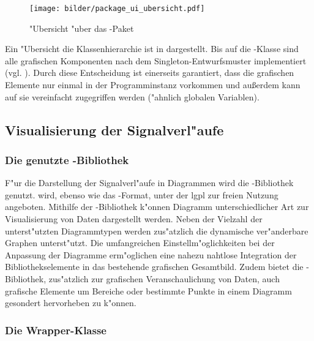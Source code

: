 \begin{figure}[htb]
\centering
\texttt{[image: bilder/package\_ui\_ubersicht.pdf]}
\caption{"Ubersicht "uber das -Paket}
\label{pic:package_ui_ubersicht}
\end{figure}

Ein "Ubersicht die Klassenhierarchie ist in  dargestellt.
Bis auf die -Klasse sind alle grafischen Komponenten nach dem Singleton-Entwurfsmuster implementiert (vgl. ).
Durch diese Entscheidung ist einerseits garantiert, dass die grafischen Elemente nur einmal in der Programminstanz vorkommen und au{\ss}erdem kann auf sie vereinfacht zugegriffen werden ("ahnlich globalen Variablen).


\subsection{Visualisierung der Signalverl"aufe}

\subsubsection{Die genutzte \jfcNS-Bibliothek}

F"ur die Darstellung der Signalverl"aufe in Diagrammen wird die \javaNS-Bibliothek \jfc genutzt.
\jfc wird, ebenso wie das \usNS-Format, unter der \ac{lgpl} zur freien Nutzung angeboten.
Mithilfe der \jfcNS-Bibliothek k"onnen Diagramm unterschiedlicher Art zur Visualisierung von Daten dargestellt werden.
Neben der Vielzahl der unterst"utzten Diagrammtypen werden zus"atzlich die dynamische ver"anderbare Graphen unterst"utzt.
Die umfangreichen Einstellm"oglichkeiten bei der Anpassung der Diagramme erm"oglichen eine nahezu nahtlose Integration der Bibliothekselemente in das bestehende grafischen Gesamtbild.
Zudem bietet die \jfcNS-Bibliothek, zus"atzlich zur grafischen Veranschaulichung von Daten, auch grafische Elemente um Bereiche oder bestimmte Punkte in einem Diagramm gesondert hervorheben zu k"onnen.


\subsubsection{Die Wrapper-Klasse }

